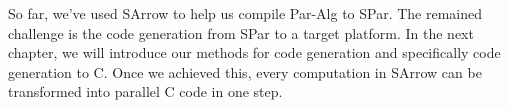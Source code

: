 So far, we've used SArrow to help us compile Par-Alg to SPar. The remained challenge is the code generation from SPar to a target platform. In the next chapter, we will introduce our methods for code generation and specifically code generation to C. Once we achieved this, every computation in SArrow can be transformed into parallel C code in one step.

